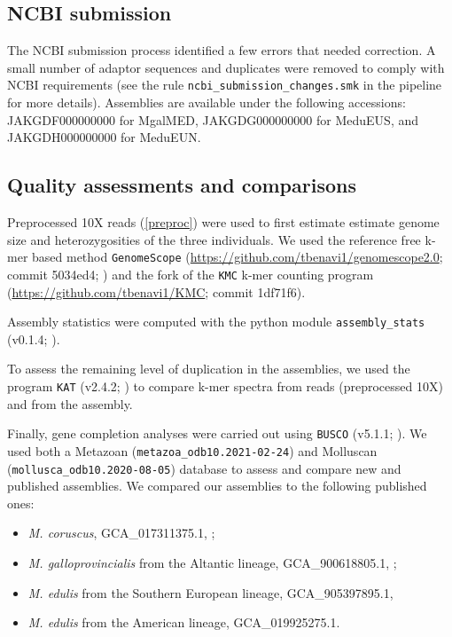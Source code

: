 \documentclass[11pt, a4paper]{article}
\begin{document}
\subsection{NCBI submission}

The NCBI submission process identified a few errors that needed correction.
A small number of adaptor sequences and duplicates were removed to comply with NCBI requirements
(see the rule \texttt{ncbi\_submission\_changes.smk} in the pipeline for more details).
Assemblies are available under the following accessions: 
JAKGDF000000000 for MgalMED,
JAKGDG000000000 for MeduEUS,
and JAKGDH000000000 for MeduEUN.


\subsection{Quality assessments and comparisons}

Preprocessed 10X reads (\cref{preproc}) were used to first estimate estimate genome size and heterozygosities of the three individuals.
We used the reference free k-mer based method \texttt{GenomeScope} (\url{https://github.com/tbenavi1/genomescope2.0}; commit 5034ed4; \cite{Ranallo-Benavidez2020}) and the fork of the \texttt{KMC} k-mer  counting program (\url{https://github.com/tbenavi1/KMC}; commit 1df71f6).

Assembly statistics were computed with the python module \texttt{assembly\_stats} (v0.1.4; \cite{Trizna2020}).

To assess the remaining level of duplication in the assemblies, we used the program \texttt{KAT} (v2.4.2; \cite{Mapleson2017}) to compare k-mer spectra from reads (preprocessed 10X) and from the assembly.

Finally, gene completion analyses were carried out using \texttt{BUSCO} (v5.1.1; \cite{Manni2021}).
We used both a Metazoan (\texttt{metazoa\_odb10.2021-02-24}) and Molluscan (\texttt{mollusca\_odb10.2020-08-05}) database to assess and compare new and published assemblies.
We compared our assemblies to the following published ones:
\begin{itemize}
	\item \textit{M. coruscus}, GCA\_017311375.1, \textcite{Yang2021};
	\item \textit{M. galloprovincialis} from the Altantic lineage, GCA\_900618805.1, \textcite{Gerdol2020};
	\item \textit{M. edulis} from the Southern European lineage, GCA\_905397895.1, \textcite{Corrochano-Fraile2021}
	\item \textit{M. edulis} from the American lineage, GCA\_019925275.1.
\end{itemize}
\end{document}
